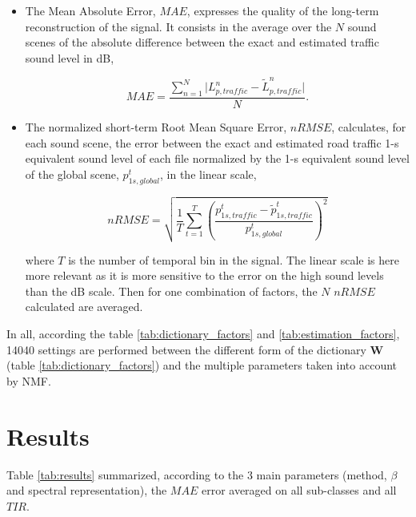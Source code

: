 \documentclass[twocolumn,a4paper,10pt]{article}
\begin{document}
\begin{itemize}

\item The Mean Absolute Error, $MAE$, expresses the quality of the long-term reconstruction of the signal. It consists in the average over the $N$ sound scenes of the absolute difference between the exact and estimated traffic sound level in dB,

\begin{equation}
MAE = \frac{\sum_{n = 1}^N\vert L^n_{p,traffic}-\tilde{L}^n_{p,traffic} \vert}{N}.
\end{equation}

\item The normalized short-term Root Mean Square Error, $nRMSE$, calculates, for each sound scene, the error between the exact and estimated road traffic 1-s equivalent sound level of each file normalized by the 1-s equivalent sound level of the global scene, $p^t_{1s,global}$, in the linear scale,

\begin{equation}
nRMSE = \sqrt{\frac{1}{T}\sum_{t = 1}^T \left(\frac{p^t_{1s,traffic}-\tilde{p}^t_{1s,traffic}}{p^t_{1s,global}}\right)^2}
\end{equation}

where $T$ is the number of temporal bin in the signal. The linear scale is here more relevant as it is more sensitive to the error on the high sound levels than the dB scale. Then for one combination of factors, the $N$ $nRMSE$ calculated are averaged.\\
\end{itemize}

In all, according the table \ref{tab:dictionary_factors} and \ref{tab:estimation_factors}, 14040 settings are performed between the different form of the dictionary $\mathbf{W}$ (table \ref{tab:dictionary_factors}) and the multiple parameters taken into account by NMF. 

\section{Results}\label{part:results}

Table \ref{tab:results} summarized, according to the 3 main parameters (method, $\beta$ and spectral representation), the $MAE$ error averaged on all sub-classes and all $TIR$.\\ 
\end{document}
